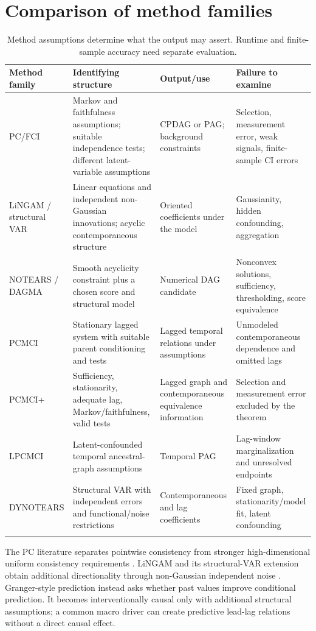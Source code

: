 \section{Comparison of method families}
\begin{longtable}{P{27mm}P{42mm}P{38mm}P{37mm}}
\toprule Method family & Identifying structure & Output/use & Failure to examine\\\midrule
\endhead
PC/FCI & Markov and faithfulness assumptions; suitable independence tests; different latent-variable assumptions & CPDAG or PAG; background constraints & Selection, measurement error, weak signals, finite-sample CI errors\\
LiNGAM / structural VAR & Linear equations and independent non-Gaussian innovations; acyclic contemporaneous structure & Oriented coefficients under the model & Gaussianity, hidden confounding, aggregation\\
NOTEARS / DAGMA & Smooth acyclicity constraint plus a chosen score and structural model & Numerical DAG candidate & Nonconvex solutions, sufficiency, thresholding, score equivalence\\
PCMCI & Stationary lagged system with suitable parent conditioning and tests & Lagged temporal relations under assumptions & Unmodeled contemporaneous dependence and omitted lags\\
PCMCI+ & Sufficiency, stationarity, adequate lag, Markov/faithfulness, valid tests & Lagged graph and contemporaneous equivalence information & Selection and measurement error excluded by the theorem\\
LPCMCI & Latent-confounded temporal ancestral-graph assumptions & Temporal PAG & Lag-window marginalization and unresolved endpoints\\
DYNOTEARS & Structural VAR with independent errors and functional/noise restrictions & Contemporaneous and lag coefficients & Fixed graph, stationarity/model fit, latent confounding\\
\bottomrule
\caption{Method assumptions determine what the output may assert. Runtime and finite-sample accuracy need separate evaluation.}
\label{tab:discovery}
\end{longtable}

The PC literature separates pointwise consistency from stronger
high-dimensional uniform consistency requirements \citep{kalisch2007}.
LiNGAM and its structural-VAR extension obtain additional directionality
through non-Gaussian independent noise \citep{shimizu2006,hyvarinen2010}.
Granger-style prediction instead asks whether past values improve
conditional prediction. It becomes interventionally causal only with
additional structural assumptions; a common macro driver can create
predictive lead-lag relations without a direct causal effect.

